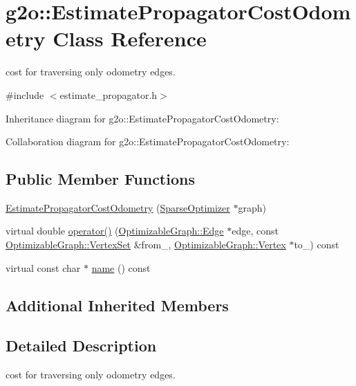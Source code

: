 \hypertarget{classg2o_1_1EstimatePropagatorCostOdometry}{}\section{g2o\+:\+:Estimate\+Propagator\+Cost\+Odometry Class Reference}
\label{classg2o_1_1EstimatePropagatorCostOdometry}


cost for traversing only odometry edges.  




{\ttfamily \#include $<$estimate\+\_\+propagator.\+h$>$}



Inheritance diagram for g2o\+:\+:Estimate\+Propagator\+Cost\+Odometry\+:


Collaboration diagram for g2o\+:\+:Estimate\+Propagator\+Cost\+Odometry\+:
\subsection*{Public Member Functions}
\begin{DoxyCompactItemize}
\item 
\hyperlink{classg2o_1_1EstimatePropagatorCostOdometry_a426a53e3cce07b71a129cc53754e9f1a}{Estimate\+Propagator\+Cost\+Odometry} (\hyperlink{classg2o_1_1SparseOptimizer}{Sparse\+Optimizer} $\ast$graph)
\item 
virtual double \hyperlink{classg2o_1_1EstimatePropagatorCostOdometry_a5f479f6d87636d71913c2a390047ea71}{operator()} (\hyperlink{classg2o_1_1OptimizableGraph_1_1Edge}{Optimizable\+Graph\+::\+Edge} $\ast$edge, const \hyperlink{classg2o_1_1HyperGraph_a703938cdb4bb636860eed55a2489d70c}{Optimizable\+Graph\+::\+Vertex\+Set} \&from\+\_\+, \hyperlink{classg2o_1_1OptimizableGraph_1_1Vertex}{Optimizable\+Graph\+::\+Vertex} $\ast$to\+\_\+) const 
\item 
virtual const char $\ast$ \hyperlink{classg2o_1_1EstimatePropagatorCostOdometry_aca626795267c23c863940eddca62a029}{name} () const 
\end{DoxyCompactItemize}
\subsection*{Additional Inherited Members}


\subsection{Detailed Description}
cost for traversing only odometry edges. 

